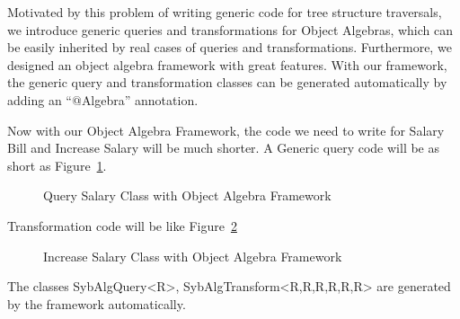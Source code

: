 Motivated by this problem of writing generic code for tree structure
traversals, we introduce generic queries and transformations for
Object Algebras, which can be easily inherited by real cases of
queries and transformations. Furthermore, we designed an object
algebra framework with great features. With our framework, the generic
query and transformation classes can be generated automatically by
adding an ``$@$Algebra'' annotation.

Now with our Object Algebra Framework, the code we need to write for
Salary Bill and Increase Salary will be much shorter. A Generic query
code will be as short as Figure~\ref{query_with_oaframework}.

\begin{figure}[tb]
\vspace{-.1in}
\caption{Query Salary Class with Object Algebra Framework}
\label{query_with_oaframework}
\end{figure}
Transformation code will be like Figure~\ref{transform_with_oaframework}
\begin{figure}[tb]
\vspace{-.1in}
\caption{Increase Salary Class with Object Algebra Framework}
\label{transform_with_oaframework}
\end{figure}
The classes SybAlgQuery<R>, SybAlgTransform<R,R,R,R,R,R> are generated
by the framework automatically. 
